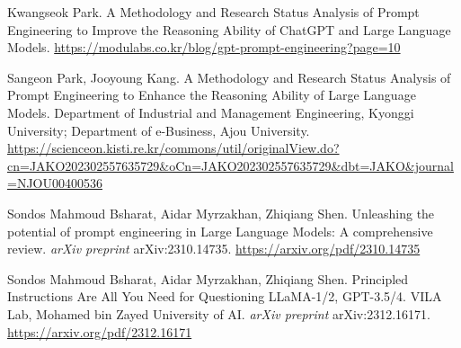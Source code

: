 \documentclass[11pt]{article}
\begin{document}
\begin{thebibliography}{99}

Kwangseok Park.  
A Methodology and Research Status Analysis of Prompt Engineering to Improve the Reasoning Ability of ChatGPT and Large Language Models.  
\url{https://modulabs.co.kr/blog/gpt-prompt-engineering?page=10}

Sangeon Park, Jooyoung Kang.  
A Methodology and Research Status Analysis of Prompt Engineering to Enhance the Reasoning Ability of Large Language Models.  
Department of Industrial and Management Engineering, Kyonggi University; Department of e-Business, Ajou University.  
\url{https://scienceon.kisti.re.kr/commons/util/originalView.do?cn=JAKO202302557635729&oCn=JAKO202302557635729&dbt=JAKO&journal=NJOU00400536}

Sondos Mahmoud Bsharat, Aidar Myrzakhan, Zhiqiang Shen.  
Unleashing the potential of prompt engineering in Large Language Models: A comprehensive review.  
\textit{arXiv preprint} arXiv:2310.14735.  
\url{https://arxiv.org/pdf/2310.14735}

Sondos Mahmoud Bsharat, Aidar Myrzakhan, Zhiqiang Shen.  
Principled Instructions Are All You Need for Questioning LLaMA-1/2, GPT-3.5/4.  
VILA Lab, Mohamed bin Zayed University of AI.  
\textit{arXiv preprint} arXiv:2312.16171.  
\url{https://arxiv.org/pdf/2312.16171}

\end{thebibliography}
\end{document}
